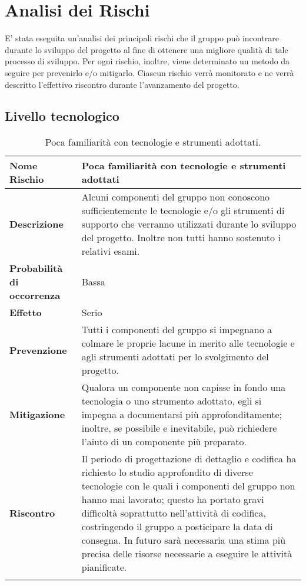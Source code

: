 \documentclass[../PianoDiProgetto.tex]{subfiles}
\begin{document}
	\section{Analisi dei Rischi}
	E' stata eseguita un'analisi dei principali rischi che il gruppo può incontrare
	durante lo sviluppo del progetto al fine di ottenere una migliore qualità di tale
	processo di sviluppo. Per ogni rischio, inoltre, viene determinato un metodo
	da seguire per prevenirlo e/o mitigarlo. Ciascun rischio verrà monitorato e ne
	verrà descritto l'effettivo riscontro durante l'avanzamento del progetto.
		\subsection{Livello tecnologico}
			\begin{table}[H]
				\center
				\begin{tabularx}{\textwidth}{X X}
					\noalign{\hrule height 1.5pt}
					\textbf{Nome Rischio} & Poca familiarità con tecnologie e strumenti adottati \\
					\hline
					\textbf{Descrizione}  & Alcuni componenti del gruppo non conoscono
					sufficientemente le tecnologie e/o gli strumenti
					di supporto che verranno utilizzati durante lo
					sviluppo del progetto. Inoltre non tutti hanno
					sostenuto i relativi esami.  \\
					\hline
					\textbf{Probabilità di occorrenza}  & Bassa  \\
					\hline
					\textbf{Effetto}  & Serio  \\
					\hline
					\textbf{Prevenzione}  & Tutti i componenti del gruppo si impegnano a
					colmare le proprie lacune in merito alle
					tecnologie e agli strumenti adottati per lo
					svolgimento del progetto.  \\
					\hline
					\textbf{Mitigazione}  & Qualora un componente non capisse in fondo una
tecnologia o uno strumento adottato, egli si impegna a documentarsi più approfonditamente;
inoltre, se possibile e inevitabile, può richiedere
l'aiuto di un componente più preparato. \\
					\hline
					\textbf{Riscontro} & Il periodo di progettazione di dettaglio e codifica ha richiesto lo studio approfondito di diverse tecnologie con le quali i componenti del gruppo non hanno mai lavorato; questo ha portato gravi difficoltà soprattutto nell'attività di codifica, costringendo il gruppo \kaleidoscode a posticipare la data di consegna. In futuro sarà necessaria una stima più precisa delle risorse necessarie a eseguire le attività pianificate. \\
					\noalign{\hrule height 1.5pt}
			\end{tabularx}
			\caption{Poca familiarità con tecnologie e strumenti adottati. \label{tab:table_label}}
		\end{table}
		
\end{document}
